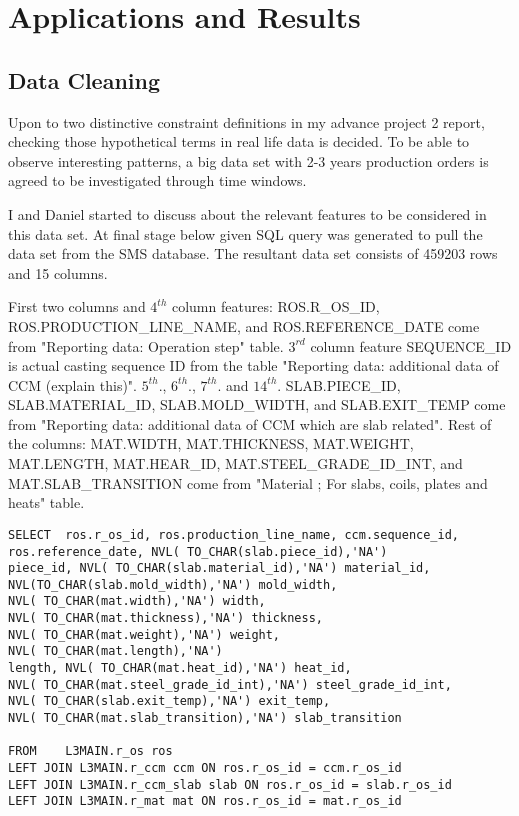 \chapter{Applications and Results}
\section{Data Cleaning}
{\color{red}
	Upon to two distinctive constraint definitions in my advance project 2 report, checking those hypothetical terms in real life data is decided. To be able to observe interesting patterns, a big data set with 2-3 years production orders is agreed to be investigated through time windows. 

I and Daniel started to discuss about the relevant features to be considered in this data set. At final stage below given SQL query was generated to pull the data set from the SMS database. The resultant data set consists of 459203 rows and 15 columns. 

First two columns and $4^{th}$ column features: ROS.R\_OS\_ID, ROS.PRODUCTION\_LINE\_NAME, and ROS.REFERENCE\_DATE come from "Reporting data: Operation step" table. $3^{rd}$ column feature SEQUENCE\_ID is actual casting sequence ID from the table "Reporting data: additional data of CCM (explain this)". $5^{th}$., $6^{th}$., $7^{th}$. and $14^{th}$. SLAB.PIECE\_ID, SLAB.MATERIAL\_ID, SLAB.MOLD\_WIDTH, and SLAB.EXIT\_TEMP come from "Reporting data: additional data of CCM which are slab related". Rest of the columns: MAT.WIDTH, MAT.THICKNESS, MAT.WEIGHT, MAT.LENGTH, MAT.HEAR\_ID, MAT.STEEL\_GRADE\_ID\_INT, and MAT.SLAB\_TRANSITION come from "Material ;  For slabs, coils, plates and heats" table.

\begin{lstlisting}
SELECT  ros.r_os_id, ros.production_line_name, ccm.sequence_id,        
ros.reference_date, NVL( TO_CHAR(slab.piece_id),'NA') 
piece_id, NVL( TO_CHAR(slab.material_id),'NA') material_id, 
NVL(TO_CHAR(slab.mold_width),'NA') mold_width, 
NVL( TO_CHAR(mat.width),'NA') width, 
NVL( TO_CHAR(mat.thickness),'NA') thickness, 
NVL( TO_CHAR(mat.weight),'NA') weight, 
NVL( TO_CHAR(mat.length),'NA')
length, NVL( TO_CHAR(mat.heat_id),'NA') heat_id, 
NVL( TO_CHAR(mat.steel_grade_id_int),'NA') steel_grade_id_int, 
NVL( TO_CHAR(slab.exit_temp),'NA') exit_temp, 
NVL( TO_CHAR(mat.slab_transition),'NA') slab_transition
	
FROM   	L3MAIN.r_os ros 
LEFT JOIN L3MAIN.r_ccm ccm ON ros.r_os_id = ccm.r_os_id 
LEFT JOIN L3MAIN.r_ccm_slab slab ON ros.r_os_id = slab.r_os_id 
LEFT JOIN L3MAIN.r_mat mat ON ros.r_os_id = mat.r_os_id 
	

\end{lstlisting}}
